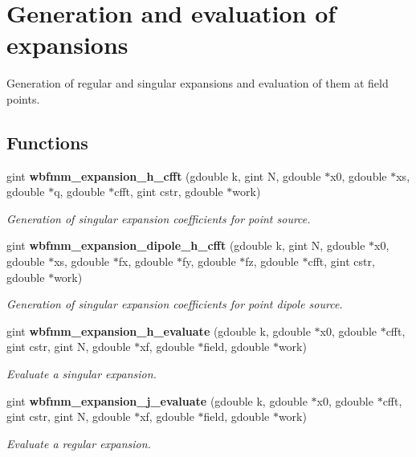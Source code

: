 \section{Generation and evaluation of expansions}
\label{group__expansions}


Generation of regular and singular expansions and evaluation of them at field points.  


\subsection*{Functions}
\begin{DoxyCompactItemize}
\item 
gint {\bf wbfmm\+\_\+expansion\+\_\+h\+\_\+cfft} (gdouble k, gint N, gdouble $\ast$x0, gdouble $\ast$xs, gdouble $\ast$q, gdouble $\ast$cfft, gint cstr, gdouble $\ast$work)
\begin{DoxyCompactList}\small\item\em Generation of singular expansion coefficients for point source. \end{DoxyCompactList}\item 
gint {\bf wbfmm\+\_\+expansion\+\_\+dipole\+\_\+h\+\_\+cfft} (gdouble k, gint N, gdouble $\ast$x0, gdouble $\ast$xs, gdouble $\ast$fx, gdouble $\ast$fy, gdouble $\ast$fz, gdouble $\ast$cfft, gint cstr, gdouble $\ast$work)
\begin{DoxyCompactList}\small\item\em Generation of singular expansion coefficients for point dipole source. \end{DoxyCompactList}\item 
gint {\bf wbfmm\+\_\+expansion\+\_\+h\+\_\+evaluate} (gdouble k, gdouble $\ast$x0, gdouble $\ast$cfft, gint cstr, gint N, gdouble $\ast$xf, gdouble $\ast$field, gdouble $\ast$work)
\begin{DoxyCompactList}\small\item\em Evaluate a singular expansion. \end{DoxyCompactList}\item 
gint {\bf wbfmm\+\_\+expansion\+\_\+j\+\_\+evaluate} (gdouble k, gdouble $\ast$x0, gdouble $\ast$cfft, gint cstr, gint N, gdouble $\ast$xf, gdouble $\ast$field, gdouble $\ast$work)
\begin{DoxyCompactList}\small\item\em Evaluate a regular expansion. \end{DoxyCompactList}\item 

\end{DoxyCompactItemize}
